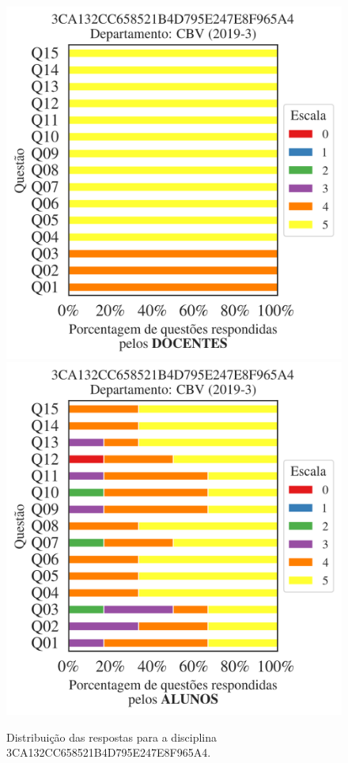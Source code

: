 \documentclass[a4paper,10pt]{article}
\begin{document}
\begin{figure}[h]
\centering
\includegraphics[width=0.485\linewidth]{analise_disciplina_departamento_CBV_3CA132CC658521B4D795E247E8F965A4_docentes.png}
\includegraphics[width=0.485\linewidth]{analise_disciplina_departamento_CBV_3CA132CC658521B4D795E247E8F965A4_alunos.png}
\caption{\label{fig:analise_geral_departamento}                Distribuição das respostas para a disciplina 3CA132CC658521B4D795E247E8F965A4. }
\end{figure}
\end{document}
